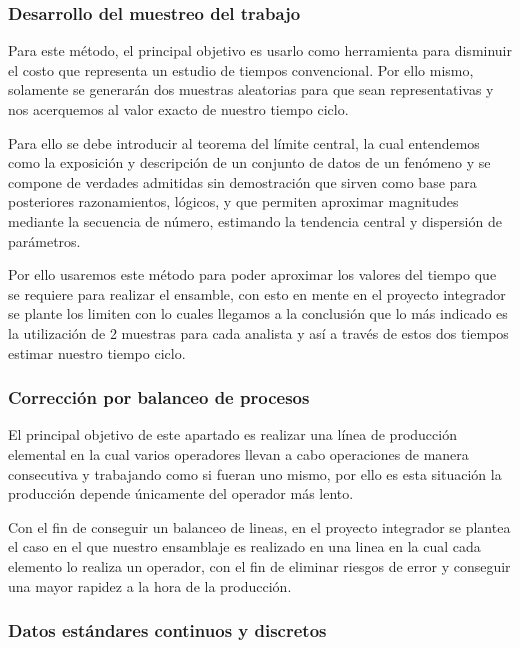     
    \subsubsection{Desarrollo del muestreo del trabajo}
    Para este método, el principal objetivo es usarlo como herramienta para disminuir el costo que representa un estudio de tiempos convencional. Por ello mismo, solamente se generarán dos muestras aleatorias para que sean representativas y nos acerquemos al valor exacto de nuestro tiempo ciclo.
    
    Para ello se debe introducir al teorema del límite central, la cual entendemos como la exposición y descripción de un conjunto de datos de un fenómeno y se compone de verdades admitidas sin demostración que sirven como base para posteriores razonamientos, lógicos, y que permiten aproximar magnitudes mediante la secuencia de número, estimando la tendencia central y dispersión de parámetros.
    
    Por ello usaremos este método para poder aproximar los valores del tiempo que se requiere para realizar el ensamble, con esto en mente en el proyecto integrador se plante los limiten con lo cuales llegamos a la conclusión que lo más indicado es la utilización de 2 muestras para cada analista y así a través de estos dos tiempos estimar nuestro tiempo ciclo.
    
    \subsubsection{Corrección por balanceo de procesos}
    
    El principal objetivo de este apartado es realizar una línea de producción elemental en la cual varios operadores llevan a cabo operaciones de manera consecutiva y trabajando como si fueran uno mismo, por ello es esta situación la producción depende únicamente del operador más lento.
    
    Con el fin de conseguir un balanceo de lineas, en el proyecto integrador se plantea el caso en el que nuestro ensamblaje es realizado en una linea en la cual cada elemento lo realiza un operador, con el fin de eliminar riesgos de error y conseguir una mayor rapidez a la hora de la producción.
    
    
    
    \subsubsection{Datos estándares continuos y discretos}
    
